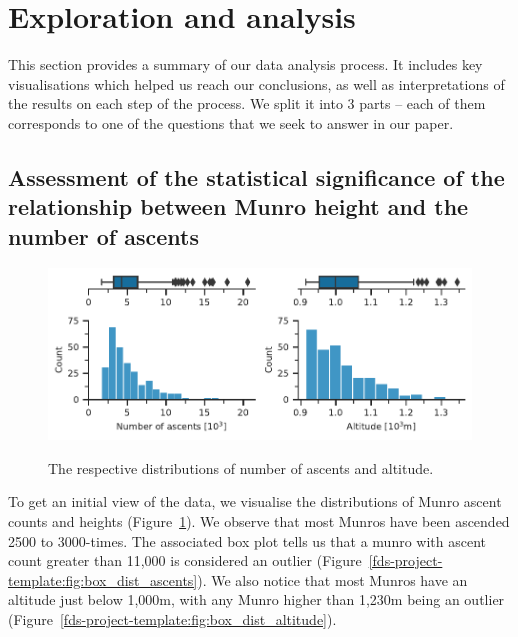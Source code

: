 \documentclass[11pt,a4paper]{article}
\begin{document}
\section{Exploration and  analysis}

This section provides a summary of our data analysis process. It includes key visualisations which helped us reach our conclusions, as well as interpretations of the results on each step of the process. We split it into 3 parts – each of them corresponds to one of the questions that we seek to answer in our paper.

\subsection{Assessment of the statistical significance of the relationship between Munro height and the number of ascents}

\begin{figure} [h!]
    \centering
    \includegraphics{report/box_dist.pdf}
    \begin{minipage}[t]{.5\linewidth}
        \centering
        \label{fds-project-template:fig:box_dist_ascents}
    \end{minipage}%
    \begin{minipage}[t]{.5\linewidth}
        \centering
        \label{fds-project-template:fig:box_dist_altitude}
    \end{minipage}
    \caption{The respective distributions of number of ascents and altitude.}
      \label{fds-project-template:fig:box_dist}
\end{figure}

To get an initial view of the data, we visualise the distributions of Munro ascent counts and heights (Figure~\ref{fds-project-template:fig:box_dist}). We observe that most Munros have been ascended 2500 to 3000-times. The associated box plot tells us that a munro with ascent count greater than 11,000 is considered an outlier (Figure~\ref{fds-project-template:fig:box_dist_ascents}). We also notice that most Munros have an altitude just below 1,000m, with any Munro higher than 1,230m being an outlier (Figure~\ref{fds-project-template:fig:box_dist_altitude}).
\end{document}
